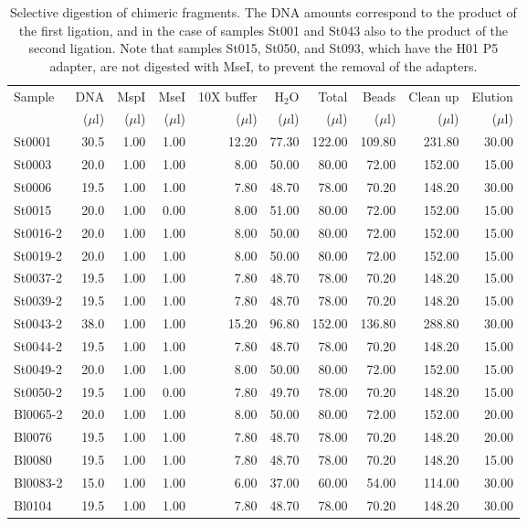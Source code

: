 \documentclass[a4paper,12pt,twosided]{article}
\begin{document}
\begin{table}
{\footnotesize
\begin{center}
\caption{Selective digestion of chimeric fragments. The DNA amounts correspond to the product of the first ligation, and in the case of samples St001 and St043 also to the product of the second ligation. Note that samples St015, St050, and St093, which have the H01 P5 adapter, are not digested with MseI, to prevent the removal of the adapters.}\label{tau:selectivedigestion}
\vspace*{0.2cm}
\begin{tabular}{lrrrrrrrrr}
\toprule
Sample&DNA&MspI&MseI&10X buffer&H$_2$O&Total&Beads&Clean up&Elution\\
&($\mu$l)&($\mu$l)&($\mu$l)&($\mu$l)&($\mu$l)&($\mu$l)&($\mu$l)&($\mu$l)&($\mu$l)\\
\midrule
St0001&30.5&1.00&1.00&12.20&77.30&122.00&109.80&231.80&30.00\\
St0003&20.0&1.00&1.00&8.00&50.00&80.00&72.00&152.00&15.00\\
St0006&19.5&1.00&1.00&7.80&48.70&78.00&70.20&148.20&30.00\\
St0015&20.0&1.00&0.00&8.00&51.00&80.00&72.00&152.00&15.00\\
St0016-2&20.0&1.00&1.00&8.00&50.00&80.00&72.00&152.00&15.00\\
St0019-2&20.0&1.00&1.00&8.00&50.00&80.00&72.00&152.00&15.00\\
St0037-2&19.5&1.00&1.00&7.80&48.70&78.00&70.20&148.20&15.00\\
St0039-2&19.5&1.00&1.00&7.80&48.70&78.00&70.20&148.20&15.00\\
St0043-2&38.0&1.00&1.00&15.20&96.80&152.00&136.80&288.80&30.00\\
St0044-2&19.5&1.00&1.00&7.80&48.70&78.00&70.20&148.20&15.00\\
St0049-2&20.0&1.00&1.00&8.00&50.00&80.00&72.00&152.00&15.00\\
St0050-2&19.5&1.00&0.00&7.80&49.70&78.00&70.20&148.20&15.00\\
Bl0065-2&20.0&1.00&1.00&8.00&50.00&80.00&72.00&152.00&20.00\\
Bl0076&19.5&1.00&1.00&7.80&48.70&78.00&70.20&148.20&20.00\\
Bl0080&19.5&1.00&1.00&7.80&48.70&78.00&70.20&148.20&15.00\\
Bl0083-2&15.0&1.00&1.00&6.00&37.00&60.00&54.00&114.00&30.00\\
Bl0104&19.5&1.00&1.00&7.80&48.70&78.00&70.20&148.20&30.00\\

\end{tabular}
\end{center}}
\end{table}
\end{document}
